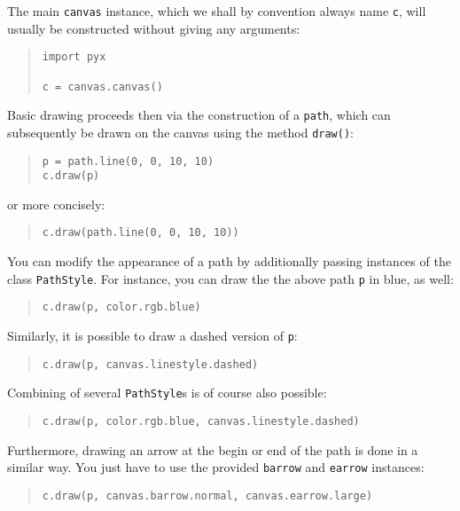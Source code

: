 The main \verb|canvas| instance, which we shall by convention always
name \verb|c|, will usually be constructed without giving any
arguments:
\begin{quote}
\begin{verbatim}
import pyx

c = canvas.canvas()
\end{verbatim}
\end{quote}
Basic drawing proceeds then via the construction of a \verb|path|, which 
can subsequently be drawn on the canvas using the method \verb|draw()|:
\begin{quote}
\begin{verbatim}
p = path.line(0, 0, 10, 10)
c.draw(p)
\end{verbatim}
\end{quote}
or more concisely:
\begin{quote}
\begin{verbatim}
c.draw(path.line(0, 0, 10, 10))
\end{verbatim}
\end{quote}
You can modify the appearance of a path by additionally passing 
instances of the class \verb|PathStyle|. For instance, you can draw the 
the above path \verb|p| in blue, as well:
\begin{quote}
\begin{verbatim}
c.draw(p, color.rgb.blue)
\end{verbatim}
\end{quote}
Similarly, it is possible to draw a dashed version of \verb|p|:
\begin{quote}
\begin{verbatim}
c.draw(p, canvas.linestyle.dashed)
\end{verbatim}
\end{quote}
Combining of several \verb|PathStyle|s is of course also possible:
\begin{quote}
\begin{verbatim}
c.draw(p, color.rgb.blue, canvas.linestyle.dashed)
\end{verbatim}
\end{quote}
Furthermore, drawing an arrow at the begin or end of the path is done
in a similar way. You just have to use the provided \verb|barrow| and 
\verb|earrow| instances:
\begin{quote}
\begin{verbatim}
c.draw(p, canvas.barrow.normal, canvas.earrow.large)
\end{verbatim}
\end{quote}

